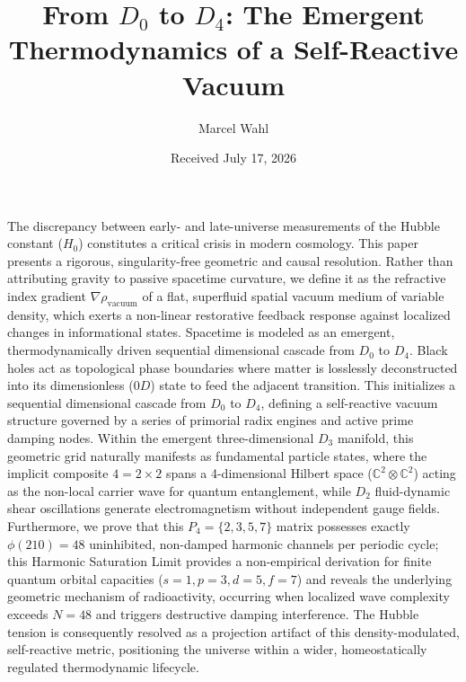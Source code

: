 \documentclass[twocolumn]{aa}
\begin{document}

\title{From $D_0$ to $D_4$: The Emergent Thermodynamics of a Self-Reactive Vacuum}
\author{Marcel Wahl}
\date{Received July 17, 2026}

\abstract
   {The discrepancy between early- and late-universe measurements of the Hubble constant ($H_{0}$) constitutes a critical crisis in modern cosmology.}
   {This paper presents a rigorous, singularity-free geometric and causal resolution. Rather than attributing gravity to passive spacetime curvature, we define it as the refractive index gradient $\nabla\rho_{\text{vacuum}}$ of a flat, superfluid spatial vacuum medium of variable density, which exerts a non-linear restorative feedback response against localized changes in informational states.} 
   {Spacetime is modeled as an emergent, thermodynamically driven sequential dimensional cascade from $D_{0}$ to $D_{4}$.}
   {Black holes act as topological phase boundaries where matter is losslessly deconstructed into its dimensionless ($0D$) state to feed the adjacent transition. This initializes a sequential dimensional cascade from $D_0$ to $D_4$, defining a self-reactive vacuum structure governed by a series of primorial radix engines and active prime damping nodes. Within the emergent three-dimensional $D_3$ manifold, this geometric grid naturally manifests as fundamental particle states, where the implicit composite $4 = 2 \times 2$ spans a 4-dimensional Hilbert space ($\mathbb{C}^2 \otimes \mathbb{C}^2$) acting as the non-local carrier wave for quantum entanglement, while $D_2$ fluid-dynamic shear oscillations generate electromagnetism without independent gauge fields. Furthermore, we prove that this $P_4 = \{2, 3, 5, 7\}$ matrix possesses exactly $\phi(210)=48$ uninhibited, non-damped harmonic channels per periodic cycle; this Harmonic Saturation Limit provides a non-empirical derivation for finite quantum orbital capacities ($s=1, p=3, d=5, f=7$) and reveals the underlying geometric mechanism of radioactivity, occurring when localized wave complexity exceeds $N=48$ and triggers destructive damping interference.}
   {The Hubble tension is consequently resolved as a projection artifact of this density-modulated, self-reactive metric, positioning the universe within a wider, homeostatically regulated thermodynamic lifecycle.}
 
\end{document}
